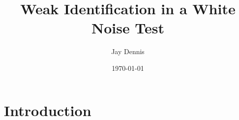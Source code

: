 




\title[Id Robust Max Corr Test] %
{Weak Identification in a White Noise Test
}
\author[Jay Dennis] %
{Jay Dennis
}
\date[\today] %
{\today}




\begin{frame}[noframenumbering]
\titlepage
\begin{center}
\small
\end{center}
\end{frame}



\section{Introduction}



